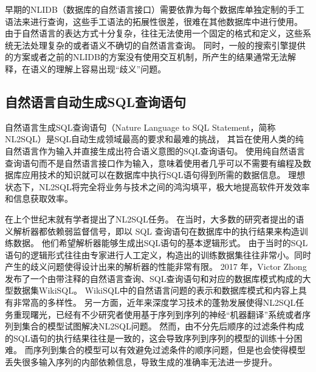 早期的NLIDB（数据库的自然语言接口\cite{Androutsopoulos1995Natural}）需要依靠为每个数据库单独定制的手工语法来进行查询，这些手工语法的拓展性很差，很难在其他数据库中进行使用。
由于自然语言的表达方式十分复杂，往往无法使用一个固定的格式和定义，这些系统无法处理复杂的或者语义不确切的自然语言查询。
同时，一般的搜索引擎提供的方案或者之前的NLIDB的方案没有使用交互机制，所产生的结果通常无法解释，在语义的理解上容易出现“歧义”问题。
\subsection{自然语言自动生成SQL查询语句}
\label{intro:nl2sql}
自然语言生成SQL查询语句（Nature Language to SQL Statement，简称NL2SQL）是SQL自动生成领域最高的要求和最难的挑战，
其旨在使用人类的纯自然语言作为输入并直接生成出符合语义意图的SQL查询语句。
使用纯自然语言查询语句而不是自然语言接口作为输入，意味着使用者几乎可以不需要有编程及数据库应用技术的知识就可以在数据库中执行SQL语句得到所需的数据信息。
理想状态下，NL2SQL将完全将业务与技术之间的鸿沟填平，极大地提高软件开发效率和信息获取效率。

在上个世纪末就有学者提出了NL2SQL任务。
在当时，大多数的研究者提出的语义解析器\cite{goldman2017weakly}都依赖弱监督信号，即以 SQL 查询语句在数据库中的执行结果来构造训练数据。
他们希望解析器能够生成出SQL语句的基本逻辑形式。
由于当时的SQL语句的逻辑形式往往由专家进行人工定义，构造出的训练数据集往往非常小。同时产生的歧义问题使得设计出来的解析器的性能非常有限。
2017 年，Victor Zhong\cite{zhong2017seq2sql}发布了一个由带注释的自然语言查询、SQL查询语句和对应的数据库模式构成的大型数据集WikiSQL。
WikiSQL中的自然语言问题的表示和数据库模式和内容上具有非常高的多样性。
另一方面，近年来深度学习技术的蓬勃发展使得NL2SQL任务重现曙光，已经有不少研究者使用基于序列到序列的神经“机器翻译”系统\cite{zhong2017seq2sql,dong2016language}或者序列到集合的模型\cite{xu2017sqlnet,yu2018typesql}试图解决NL2SQL问题。
然而，由不分先后顺序的过滤条件构成的SQL语句的执行结果往往是一致的，这会导致序列到序列的模型的训练十分困难。
而序列到集合的模型可以有效避免过滤条件的顺序问题，但是也会使得模型丢失很多输入序列的内部依赖信息，导致生成的准确率无法进一步提升。


